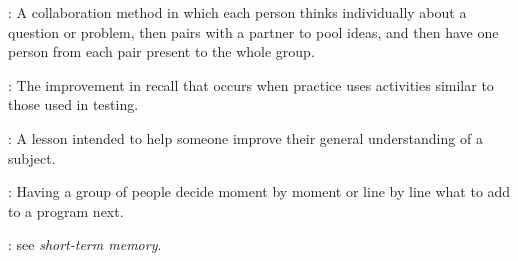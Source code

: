 \begin{description}
: A collaboration method in which
each person thinks individually about a question or problem, then pairs with a
partner to pool ideas, and then have one person from each pair present to the
whole group.

: The
improvement in recall that occurs when practice uses activities similar to those
used in testing.

: A lesson intended to help someone improve their
general understanding of a subject.

: Having a group of people decide moment
by moment or line by line what to add to a program next.

: see \emph{short-term memory}.

\end{description}
